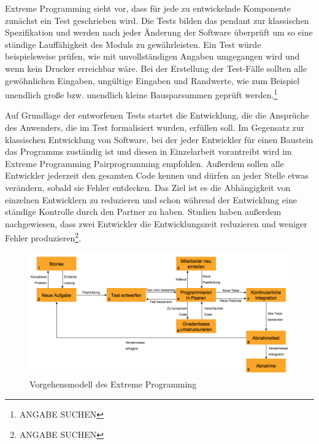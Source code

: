                 Extreme Programming sieht vor, dass für jede zu entwickelnde Komponente zunächst ein Test geschrieben wird. Die Tests bilden das pendant zur klassischen Spezifikation und werden nach jeder Änderung der Software überprüft um so eine ständige Lauffähigkeit des Moduls zu gewährleisten. Ein Test würde beispielsweise prüfen, wie mit unvollständigen Angaben umgegangen wird und wenn kein Drucker erreichbar wäre. Bei der Erstellung der Test-Fälle sollten alle gewöhnlichen Eingaben, ungültige Eingaben und Randwerte, wie zum Beispiel unendlich große bzw. unendlich kleine Bausparsummen geprüft werden.\footnote{ANGABE SUCHEN}

                Auf Grundlage der entworfenen Tests startet die Entwicklung, die die Ansprüche des Anwenders, die im Test formalisiert wurden, erfüllen soll. Im Gegensatz zur klassischen Entwicklung von Software, bei der jeder Entwickler für einen Baustein das Programms zuständig ist und diesen in Einzelarbeit vorantreibt wird im Extreme Programming Pairprogramming empfohlen. Außerdem sollen alle Entwickler jederzeit den gesamten Code kennen und dürfen an jeder Stelle etwas verändern, sobald sie Fehler entdecken. Das Ziel ist es die Abhängigkeit von einzelnen Entwicklern zu reduzieren und schon während der Entwicklung eine ständige Kontrolle durch den Partner zu haben. Studien haben außerdem nachgewiesen, dass zwei Entwickler die Entwicklungszeit reduzieren und weniger Fehler produzieren\footnote{ANGABE SUCHEN}.

                \begin{figure}[!htbp]
                    \includegraphics[width=15cm]{Abbildungen/XP_vorgehensmodell}
                    \caption{Vorgehensmodell des Extreme Programming\protect\footnotemark}
                    \label{abb:xpmodel}
                \end{figure}


